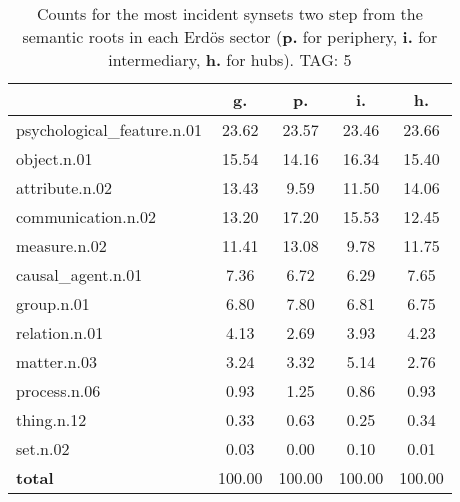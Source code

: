 \begin{table}[h!]
\begin{center}
\begin{tabular}{| l || c | c | c | c |}\hline
 & {\bf g.} & {\bf p.} & {\bf i.} & {\bf h.} \\\hline\hline
psychological\_feature.n.01 & 23.62  & 23.57  & 23.46  & 23.66 \\\hline
object.n.01 & 15.54  & 14.16  & 16.34  & 15.40 \\\hline
attribute.n.02 & 13.43  & 9.59  & 11.50  & 14.06 \\\hline
communication.n.02 & 13.20  & 17.20  & 15.53  & 12.45 \\\hline
measure.n.02 & 11.41  & 13.08  & 9.78  & 11.75 \\\hline
causal\_agent.n.01 & 7.36  & 6.72  & 6.29  & 7.65 \\\hline
group.n.01 & 6.80  & 7.80  & 6.81  & 6.75 \\\hline
relation.n.01 & 4.13  & 2.69  & 3.93  & 4.23 \\\hline
matter.n.03 & 3.24  & 3.32  & 5.14  & 2.76 \\\hline
process.n.06 & 0.93  & 1.25  & 0.86  & 0.93 \\\hline
thing.n.12 & 0.33  & 0.63  & 0.25  & 0.34 \\\hline
set.n.02 & 0.03  & 0.00  & 0.10  & 0.01 \\\hline\hline
{{\bf total}} & 100.00  & 100.00  & 100.00  & 100.00 \\\hline
\end{tabular}
\caption{Counts for the most incident synsets two step from the semantic roots in each Erd\"os sector ({\bf p.} for periphery, {\bf i.} for intermediary, {\bf h.} for hubs). TAG: 5}
\end{center}
\end{table}